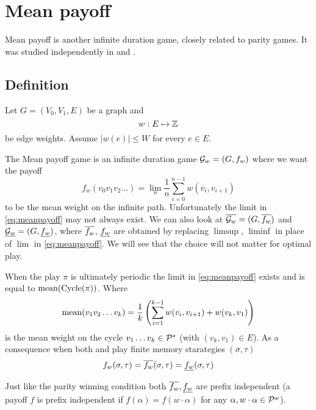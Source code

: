 \chapter{Mean payoff}
\label{chap:mean}

Mean payoff is another infinite duration game, closely related to parity games. It was studied independently in \cite{ehrenfeucht_positional_1979} and \cite{gurvich_cyclic_1988}.

\section{Definition}
Let $G=(V_0,V_1,E)$ be a graph and
\[
    w : E \mapsto \mathbb{Z}
\]
be edge weights. Assume $|w(e)| \leq W$ for every $e \in E$.

The Mean payoff game is an infinite duration game $\mathcal{G}_w=(G,f_w)$ where we want the payoff
\begin{equation}
    f_w (v_0v_1v_2 \ldots) = \lim_n \frac{1}{n} \sum_{i=0}^{n-1} w(v_i,v_{i+1}) \label{eq:meanpayoff}
\end{equation}
to be the mean weight on the infinite path. Unfortunately the limit in \eqref{eq:meanpayoff} may not always exist.
We can also look at $\overline{\mathcal{G}_w}=(G,\overline{f_w})$ and $\underline{\mathcal{G}_w}=(G,\underline{f_w})$, where $\overline{f_w}$, $\underline{f_w}$ are obtained by replacing $\limsup$, $\liminf$ in place of $\lim$ in \eqref{eq:meanpayoff}. We will see that the choice will not matter for optimal play. %

When the play $\pi$ is ultimately periodic the limit in \eqref{eq:meanpayoff} exists and is equal to $\operatorname*{mean}(\operatorname{Cycle}(\pi))$. Where
\begin{equation}
    \operatorname*{mean}(v_1 v_2 \ldots v_k) = \frac{1}{k} \left( \sum_{i=1}^{k-1} w(v_i, v_{i+1}) + w(v_k, v_1) \right) \label{eq:mean}
\end{equation}
is the mean weight on the cycle $v_1 \ldots v_k \in \mathcal{P}^{*}$ (with $(v_k,v_1) \in E$).
As a consequence when both  and  play finite memory starategies $(\sigma,\tau)$
\[
    f_w(\sigma,\tau) = \overline{f_w}(\sigma,\tau) = \underline{f_w}(\sigma,\tau)
\]

Just like the parity winning condition both $\overline{f_w},\underline{f_w}$ are prefix independent (a payoff $f$ is prefix independent if $f(\alpha) = f(w \cdot \alpha)$ for any $\alpha, w \cdot \alpha \in \mathcal{P}^\omega$).


